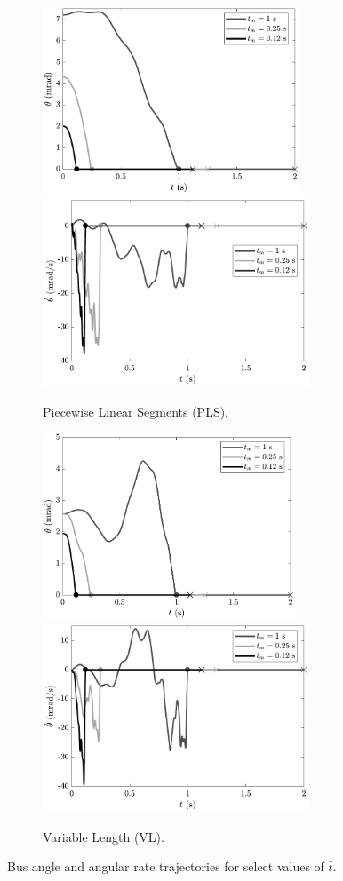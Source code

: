 \begin{figure}[p]
    \centering
    \begin{subfigure}[b]{\textwidth}
      \centering
      \includegraphics[height=2.2in]{../ch7/figures/ThetasPLS.pdf}%
      \includegraphics[height=2.2in]{../ch7/figures/dThetasPLS.pdf}%
      \caption{Piecewise Linear Segments (PLS).}\label{fig:ch7:thetas_pls}
    \end{subfigure}
    \begin{subfigure}[b]{\textwidth}
      \centering
      \includegraphics[height=2.2in]{../ch7/figures/ThetasVL.pdf}%
      \includegraphics[height=2.2in]{../ch7/figures/dThetasVL.pdf}%
      \caption{Variable Length (VL).}\label{fig:ch7:thetas_vl}
    \end{subfigure}
    \caption{Bus angle and angular rate trajectories for select values of $\bar{t}$.\label{fig:ch7:thetas}}
\end{figure}